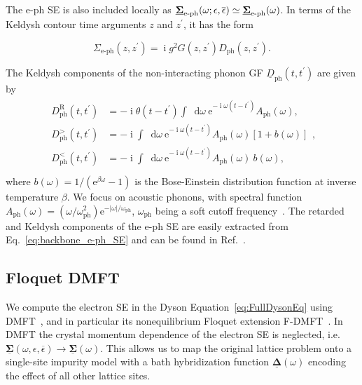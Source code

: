 \documentclass[aps,prb,groupedaddress,showpacs,twocolumn,superscriptaddress,10pt]{revtex4-2}
\newcommand{\ee}{\mathrm{e}}  %
\DeclareMathOperator*{\ii}{i} %
\newcommand*\dd{\mathop{}\!\mathrm{d}}
\newcommand{\mat}[1]{\bm{#1}} %
\newcommand{\kel}[1]{\underline{#1}} %
\begin{document}
The e-ph SE is also included locally as $\underline{\bf{\Sigma}}_{\text{e-ph}}(\omega;\epsilon,\overline{\epsilon}) \simeq \underline{\bf{\Sigma}}_{\text{e-ph}}(\omega)$. In terms of the Keldysh contour time arguments $z$ and $z^\prime$, it has the form 

\begin{equation}\label{eq:backbone_e-ph_SE}
\Sigma_{\text{e-ph}}(z,z^{\prime}) = \ii g^{2} G(z,z^{\prime}) D_{\text{ph}}(z,z^{\prime}).
\end{equation}
 
The Keldysh components of the non-interacting phonon GF $\kel{D}_{\text{ph}}(t,t^{\prime})$ are given by~\cite{ao.ts.14}
\begin{align}\label{eq:Ph_Prop_time}
\begin{split} 
D^{\text{R}}_{\text{ph}}(t,t^{\prime}) & = -\ii \theta(t-t^{\prime}) \int \dd\omega \ \ee^{-\ii\omega\left(t-t^{\prime}\right)} A_{\text{ph}}(\omega), \\
D^{>}_{\text{ph}}(t,t^{\prime}) & = -\ii \int \dd\omega \ \ee^{-\ii\omega\left(t-t^{\prime}\right)} A_{\text{ph}}(\omega) \left[ 1 + b(\omega) \right] \\
D^{<}_{\text{ph}}(t,t^{\prime}) & = -\ii \int \dd\omega \ \ee^{-\ii\omega\left(t-t^{\prime}\right)} A_{\text{ph}}(\omega) \ b(\omega), \\
\end{split}, 
\end{align}
where $b(\omega)=1/(\ee^{\beta\omega}-1)$ is the Bose-Einstein distribution function at inverse temperature $\beta$. We focus on acoustic phonons, with spectral function $A_{\text{ph}}(\omega) = (\omega/\omega^{2}_{\text{ph}}) \ee^{-| \omega|/\omega_{\text{ph}}}$,  $\omega_{\text{ph}}$ being a soft cutoff frequency~\cite{pi.li.21}. The retarded and Keldysh components of the e-ph SE are easily extracted from  Eq.~\eqref{eq:backbone_e-ph_SE} and can be found in Ref.~\cite{ma.ga.22u}.
     
\subsection{Floquet DMFT} 
\label{sec:FDMFT_implementation}

We compute the electron SE in the Dyson Equation~\eqref{eq:FullDysonEq} using DMFT~\cite{me.vo.89,ge.ko.92,ge.ko.96}, and in particular its nonequilibrium Floquet extension F-DMFT~\cite{ts.ok.08,sc.mo.02u,jo.fr.08}. In DMFT the crystal momentum dependence of the electron SE is neglected, i.e. $\kel{\mat{\Sigma}}(\omega,\epsilon,\overline{\epsilon}) \to \kel{\mat{\Sigma}}(\omega)$. This allows us to map the original lattice problem onto a single-site impurity model with a bath hybridization function $\kel{\mat\Delta}(\omega)$ encoding the effect of all other lattice sites. 
\end{document}
